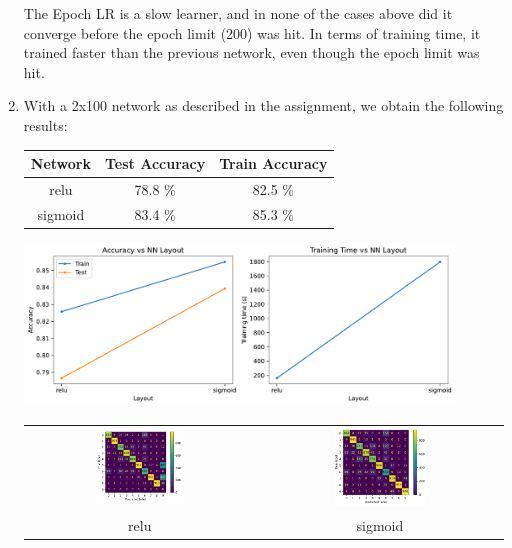 \documentclass[12pt]{article}
\begin{document}
\begin{enumerate}[label=(\alph*)]
    The Epoch LR is a slow learner, and in none of the cases above did it converge
    before the epoch limit (200) was hit. In terms of training time, it trained
    faster than the previous network, even though the epoch limit was hit.

    \item With a 2x100 network as described in the assignment, we obtain the 
    following results:

    \begin{center}
        \begin{tabular}{|c|c|c|}
            \hline
            Network & Test Accuracy & Train Accuracy \\ 
            \hline 
            relu    & 78.8 \% & 82.5 \% \\
            sigmoid & 83.4 \% & 85.3 \% \\
            \hline
        \end{tabular}
    \end{center}
    
    \begin{center}
        \includegraphics[width=0.9\textwidth]{../Q2/two_layer_relu_sigmoid/acc_time.pdf}
    \end{center}
    \begin{center}
        \begin{tabular}{c c}
            \includegraphics[width=0.4\textwidth]{../Q2/two_layer_relu_sigmoid/cmat_relu.pdf} &
            \includegraphics[width=0.4\textwidth]{../Q2/two_layer_relu_sigmoid/cmat_sigmoid.pdf} \\
            relu & sigmoid
        \end{tabular}
    \end{center}


\end{enumerate}
\end{document}
